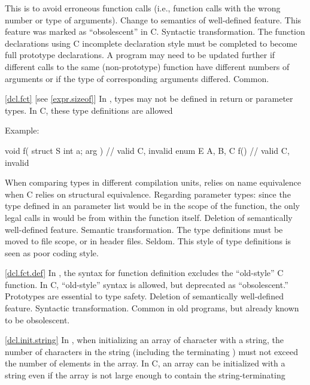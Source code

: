 \rationale
This is to avoid erroneous function calls (i.e., function calls
with the wrong number or type of arguments).
\effect
Change to semantics of well-defined feature.
This feature was marked as ``obsolescent'' in C.
\difficulty
Syntactic transformation.
The function declarations using C incomplete declaration style must
be completed to become full prototype declarations.
A program may need to be updated further if different calls to the
same (non-prototype) function have different numbers of arguments or
if the type of corresponding arguments differed.
\howwide
Common.

\ref{dcl.fct} [see \ref{expr.sizeof}]
\change In \Cpp, types may not be defined in return or parameter types. In C, these type definitions are allowed

Example:

\begin{codeblock}
void f( struct S { int a; } arg ) {}    // valid C, invalid \Cpp
enum E { A, B, C } f() {}               // valid C, invalid \Cpp
\end{codeblock}

\rationale
When comparing types in different compilation units, \Cpp relies
on name equivalence when C relies on structural equivalence.
Regarding parameter types: since the type defined in an parameter list
would be in the scope of the function, the only legal calls in \Cpp
would be from within the function itself.
\effect
Deletion of semantically well-defined feature.
\difficulty
Semantic transformation.
The type definitions must be moved to file scope, or in header files.
\howwide
Seldom.
This style of type definitions is seen as poor coding style.

\ref{dcl.fct.def}
\change In \Cpp, the syntax for function definition excludes the ``old-style'' C function.
In C, ``old-style'' syntax is allowed, but deprecated as ``obsolescent.''
\rationale
Prototypes are essential to type safety.
\effect
Deletion of semantically well-defined feature.
\difficulty
Syntactic transformation.
\howwide
Common in old programs, but already known to be obsolescent.

\ref{dcl.init.string}
\change In \Cpp, when initializing an array of character with a string, the number of
characters in the string (including the terminating ) must not exceed the
number of elements in the array. In C, an array can be initialized with a string even if
the array is not large enough to contain the string-terminating 


